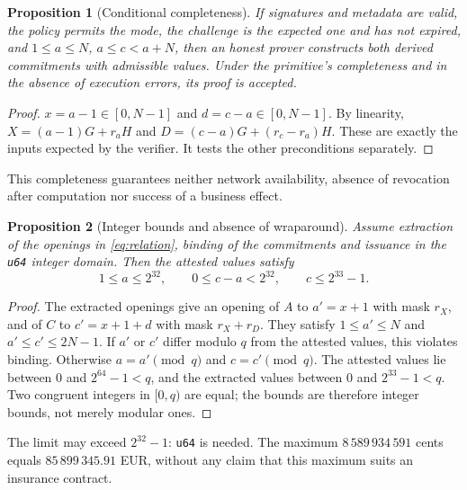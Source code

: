 \documentclass[11pt,a4paper]{article}
\newtheorem{theorem}{Proposition}
\newcommand{\code}[1]{\nolinkurl{#1}}
\begin{document}
\begin{theorem}[Conditional completeness]
If signatures and metadata are valid, the policy permits the mode,
the challenge is the expected one and has not expired, and
$1\le a\le N$, $a\le c<a+N$, then an honest prover constructs both
derived commitments with admissible values. Under the primitive's
completeness and in the absence of execution errors, its proof is accepted.
\end{theorem}
\begin{proof}
$x=a-1\in[0,N-1]$ and $d=c-a\in[0,N-1]$. By linearity,
$X=(a-1)G+r_aH$ and $D=(c-a)G+(r_c-r_a)H$.
These are exactly the inputs expected by the verifier.
It tests the other preconditions separately.
\end{proof}
This completeness guarantees neither network availability, absence of
revocation after computation nor success of a business effect.

\begin{theorem}[Integer bounds and absence of wraparound]\label{th:bounds}
Assume extraction of the openings in \eqref{eq:relation}, binding of the
commitments and issuance in the \code{u64} integer domain. Then the
attested values satisfy
\[
1\le a\le2^{32},\qquad 0\le c-a<2^{32},\qquad c\le2^{33}-1.
\]
\end{theorem}
\begin{proof}
The extracted openings give an opening of $A$ to $a'=x+1$ with
mask $r_X$, and of $C$ to $c'=x+1+d$ with mask $r_X+r_D$.
They satisfy $1\le a'\le N$ and $a'\le c'\le2N-1$.
If $a'$ or $c'$ differ modulo $q$ from the attested values, this
violates binding. Otherwise $a=a'\pmod q$ and $c=c'\pmod q$.
The attested values lie between 0 and $2^{64}-1<q$, and the extracted
values between 0 and $2^{33}-1<q$. Two congruent integers in $[0,q)$
are equal; the bounds are therefore integer bounds, not merely modular ones.
\end{proof}
The limit may exceed $2^{32}-1$: \code{u64} is needed. The maximum
$8\,589\,934\,591$ cents equals $85\,899\,345.91$ EUR, without any claim
that this maximum suits an insurance contract.
\end{document}
